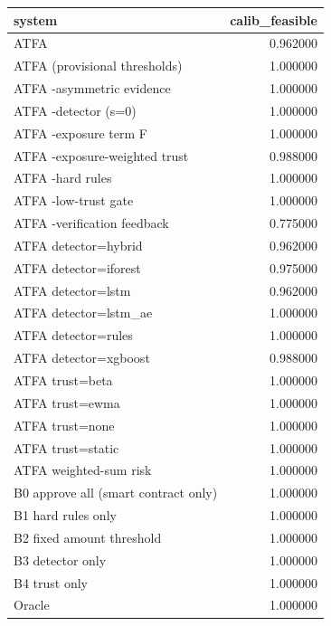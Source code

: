 \begin{tabular}{lr}
\toprule
system & calib\_feasible \\
\midrule
ATFA & 0.962000 \\
ATFA (provisional thresholds) & 1.000000 \\
ATFA -asymmetric evidence & 1.000000 \\
ATFA -detector (s=0) & 1.000000 \\
ATFA -exposure term F & 1.000000 \\
ATFA -exposure-weighted trust & 0.988000 \\
ATFA -hard rules & 1.000000 \\
ATFA -low-trust gate & 1.000000 \\
ATFA -verification feedback & 0.775000 \\
ATFA detector=hybrid & 0.962000 \\
ATFA detector=iforest & 0.975000 \\
ATFA detector=lstm & 0.962000 \\
ATFA detector=lstm\_ae & 1.000000 \\
ATFA detector=rules & 1.000000 \\
ATFA detector=xgboost & 0.988000 \\
ATFA trust=beta & 1.000000 \\
ATFA trust=ewma & 1.000000 \\
ATFA trust=none & 1.000000 \\
ATFA trust=static & 1.000000 \\
ATFA weighted-sum risk & 1.000000 \\
B0 approve all (smart contract only) & 1.000000 \\
B1 hard rules only & 1.000000 \\
B2 fixed amount threshold & 1.000000 \\
B3 detector only & 1.000000 \\
B4 trust only & 1.000000 \\
Oracle & 1.000000 \\
\bottomrule
\end{tabular}
